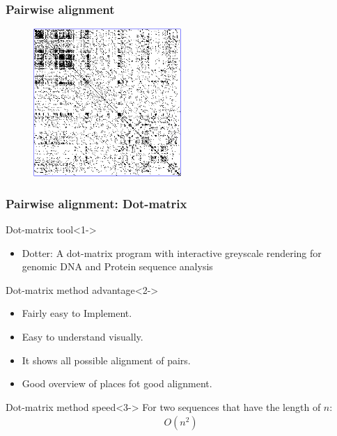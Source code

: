 \documentclass[UTF8]{beamer}
\begin{document}
	\begin{frame}
	    \frametitle{Pairwise alignment}
		\begin{figure}[H]
			\centering
			\includegraphics[width=0.5\textwidth]{image/Zinc-finger-dot-plot}
			\label{DOT-1}
		\end{figure}
	\end{frame}

	\begin{frame}
	    \frametitle{Pairwise alignment: Dot-matrix}
		\begin{block}{Dot-matrix tool}<1->
			\begin{itemize}
				\item Dotter: A dot-matrix program with interactive greyscale rendering for genomic DNA and Protein sequence analysis
			\end{itemize}
		\end{block}
		\begin{block}{Dot-matrix method advantage}<2->
			\begin{itemize}
				\item Fairly easy to Implement.
				\item Easy to understand visually.
				\item It shows all possible alignment of pairs.
				\item Good overview of places fot good alignment.
			\end{itemize}
		\end{block}
		\begin{block}{Dot-matrix method speed}<3->
			For two sequences that have the length of $n$:
			\begin{gather*}
				O(n^2)
			\end{gather*}
		\end{block}
    \end{frame}
\end{document}
